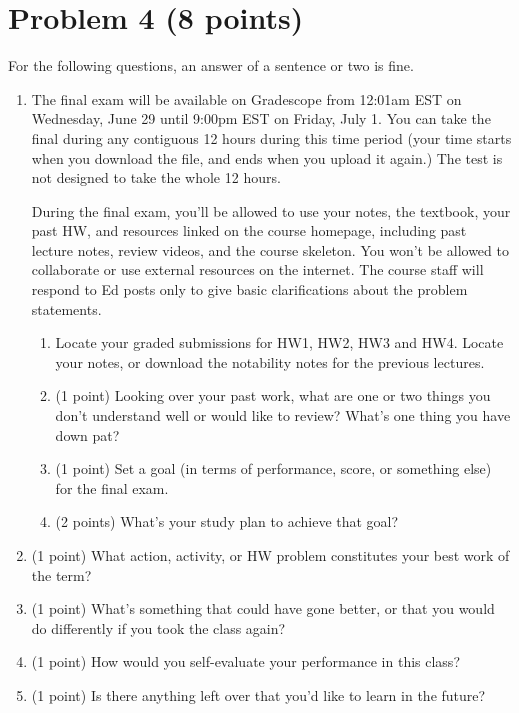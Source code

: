 \documentclass[letterpaper,11pt,twoside]{article}
\theoremstyle{plain}
\theoremstyle{definition}
\theoremstyle{remark}
\theoremstyle{restate}
\begin{document}
\section{Problem 4 (8 points)}
    For the following questions, an answer of a sentence or two is fine.
    \begin{enumerate}
        \item The final exam will be available on Gradescope from 12:01am EST on Wednesday, June 29 until 9:00pm EST on Friday, July 1. You  can take the final during any contiguous 12 hours during this time period (your time starts when you download the file, and ends when you upload it again.) The test is not designed to take the whole 12 hours.
        
        During the final exam, you'll be allowed to use your notes, the textbook, your past HW, and resources linked on the course homepage, including past lecture notes, review videos, and the course skeleton. You won't be allowed to collaborate or use external resources on the internet. The course staff will respond to Ed posts only to give basic clarifications about the problem statements.
        \begin{enumerate}
            \item Locate your graded submissions for HW1, HW2, HW3 and HW4. Locate your notes, or download the notability notes for the previous lectures. 
            \item (1 point) Looking over your past work, what are one or two things you don't understand well or would like to review? What's one thing you have down pat?
            \item (1 point) Set a goal (in terms of performance, score, or something else) for the final exam.
            \item (2 points) What's your study plan to achieve that goal?
        \end{enumerate}
        
        \item (1 point) What action, activity, or HW problem constitutes your best work of the term?
        \item (1 point) What's something that could have gone better, or that you would do differently if you took the class again?
        \item (1 point) How would you self-evaluate your performance in this class?
        \item (1 point) Is there anything left over that you'd like to learn in the future?
    \end{enumerate}
\end{document}
